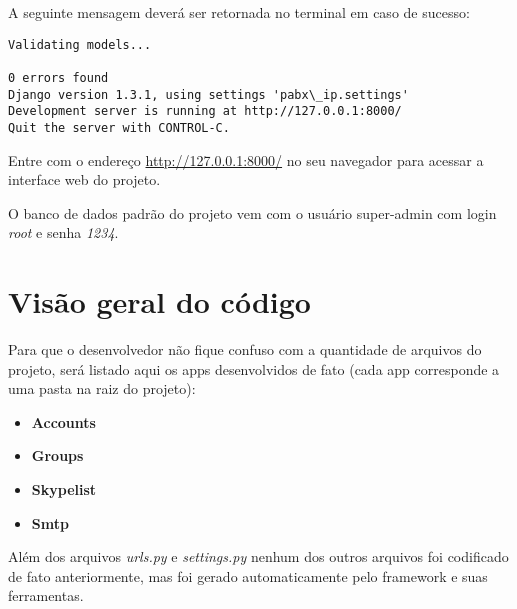 \documentclass[letterpaper,10pt,brazil]{sphinxmanual}
\begin{document}
A seguinte mensagem deverá ser retornada no terminal em caso de sucesso:

\begin{Verbatim}[commandchars=\\\{\}]
Validating models...

0 errors found
Django version 1.3.1, using settings 'pabx\_ip.settings'
Development server is running at http://127.0.0.1:8000/
Quit the server with CONTROL-C.
\end{Verbatim}

Entre com o endereço \href{http://127.0.0.1:8000/}{http://127.0.0.1:8000/} no seu navegador para acessar a interface web do projeto.

O banco de dados padrão do projeto vem com o usuário super-admin com login \emph{root} e senha \emph{1234}.


\section{Visão geral do código}
\label{codigo::doc}\label{codigo:visao-geral-do-codigo}
Para que o desenvolvedor não fique confuso com a quantidade de arquivos do projeto, será listado aqui os apps desenvolvidos de fato (cada app corresponde a uma pasta na raiz do projeto):
\begin{itemize}
\item {} 
\textbf{Accounts}

\item {} 
\textbf{Groups}

\item {} 
\textbf{Skypelist}

\item {} 
\textbf{Smtp}

\end{itemize}

Além dos arquivos \emph{urls.py} e \emph{settings.py} nenhum dos outros arquivos foi codificado de fato anteriormente, mas foi gerado automaticamente pelo framework e suas ferramentas.
\end{document}
